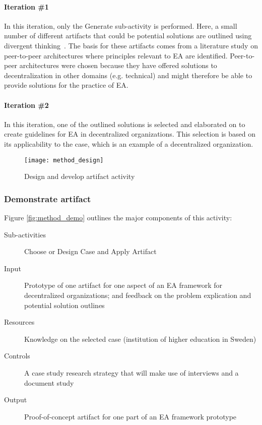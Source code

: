 \paragraph{Iteration \#1}

In this iteration, only the Generate sub-activity is performed. Here, a small number of different artifacts that could be potential solutions are outlined using divergent thinking~\cite[Ch. 7.1]{johannessonPerjons2012}. The basis for these artifacts comes from a literature study on peer-to-peer architectures where principles relevant to EA are identified. Peer-to-peer architectures were chosen because they have offered solutions to decentralization in other domains (e.g. technical) and might therefore be able to provide solutions for the practice of EA. 

\paragraph{Iteration \#2}

In this iteration, one of the outlined solutions is selected and elaborated on to create guidelines for EA in decentralized organizations. This selection is based on its applicability to the case, which is an example of a decentralized organization. 

\begin{figure}
\texttt{[image: method\_design]}
\caption{Design and develop artifact activity}
\label{fig:method_design}
\end{figure}
  
\subsubsection*{Demonstrate artifact}

Figure \ref{fig:method_demo} outlines the major components of this activity:
\begin{description}
  \item[Sub-activities]  Choose or Design Case and Apply Artifact~\cite[Ch. 8]{johannessonPerjons2012}
  \item[Input] Prototype of one artifact for one aspect of an EA framework for decentralized organizations; and feedback on the problem explication and potential solution outlines
  \item[Resources]  Knowledge on the selected case (institution of higher education in Sweden)
  \item[Controls]  A case study research strategy that will make use of interviews and a document study
  \item[Output] Proof-of-concept artifact for one part of an EA framework prototype
\end{description}

